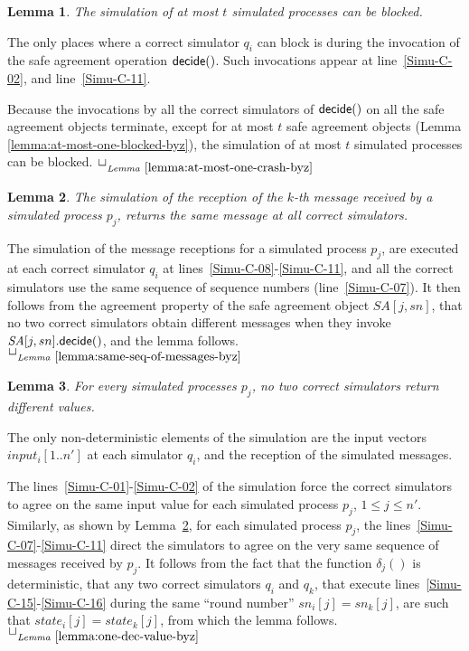 \documentclass[11pt,letterpaper]{article}
\newtheorem{lemma}{Lemma}
\newlength {\afterproof}
\newcommand{\toto}{xxx}
\newenvironment{proofL}{\noindent{\bf Proof }}
{\hspace*{\fill}$\Box_{\mathit{Lemma}~\ref{\toto}}$\par\vspace{\afterproof}}
\newcommand{\SA}{\mathit{SA}}
\begin{document}
\begin{lemma}
\label{lemma:at-most-one-crash-byz}
The simulation of at most $t$ simulated processes can be blocked.
\end{lemma}

\begin{proofL}
The only places where a correct simulator $q_i$ can block is 
during the invocation of
the safe agreement operation ${\sf decide}()$. Such invocations appear at
line~\ref{Simu-C-02}, and line~\ref{Simu-C-11}. 


Because the invocations by all the correct simulators  of ${\sf  decide}()$
on all the safe agreement objects terminate, except for at most $t$
safe agreement objects (Lemma \ref{lemma:at-most-one-blocked-byz}),
the simulation of at most $t$ simulated processes can be blocked.
\renewcommand{\toto}{lemma:at-most-one-crash-byz}
\end{proofL}

\begin{lemma}
\label{lemma:same-seq-of-messages-byz}
The simulation of the reception of the $k$-th
message received by a simulated process $p_j$, returns the same message
at all correct simulators.
\end{lemma}

\begin{proofL}
The simulation of the message receptions for a simulated process $p_j$,
are executed at each correct simulator $q_i$ at lines~\ref{Simu-C-08}-\ref{Simu-C-11},
and all the correct simulators use the same sequence of sequence numbers
(line~\ref{Simu-C-07}).
It then follows from the agreement property of the safe agreement object
$\SA[j,sn]$, that no two correct simulators obtain different messages
when they invoke  $\SA[j,sn].{\sf decide}()$, and the lemma follows.
\renewcommand{\toto}{lemma:same-seq-of-messages-byz}
\end{proofL}

\begin{lemma}
\label{lemma:one-dec-value-byz}
For every simulated processes $p_j$, no two correct simulators return
different values.
\end{lemma}

\begin{proofL}
The only non-deterministic elements of the simulation are the input vectors
$input_i[1..n']$ at each simulator $q_i$, and the reception of the simulated
messages.

The lines~\ref{Simu-C-01}-\ref{Simu-C-02} of the
simulation force  the correct simulators to agree on the same input value
for each simulated process $p_j$, $1\leq j \leq n'$.
Similarly,  as shown by Lemma~\ref{lemma:same-seq-of-messages-byz},
for each simulated process $p_j$, the lines~\ref{Simu-C-07}-\ref{Simu-C-11}
direct the simulators to  agree on the very same sequence of messages
received by $p_j$. It follows from the fact that the function $\delta_j()$
is deterministic, that   any two correct simulators $q_i$ and $q_k$,
that execute  lines~\ref{Simu-C-15}-\ref{Simu-C-16} during the
same ``round number'' $sn_i[j]=sn_k[j]$, are such that $state_i[j]=state_k[j]$,
from which the lemma follows.
\renewcommand{\toto}{lemma:one-dec-value-byz}
\end{proofL}
\end{document}
